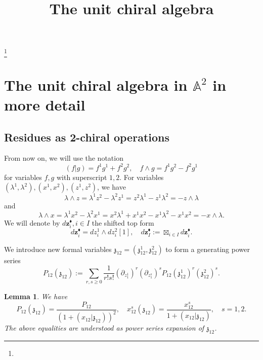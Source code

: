 \documentclass[11pt]{amsart}
\newtheorem{lem}[thm]{Lemma}
\theoremstyle{definition}
\theoremstyle{remark}
\numberwithin{equation}{section}
\begin{document}
\title[]{The unit chiral algebra}%
\author{}%
\address{}%
\email{}%

\thanks{}%
\subjclass{}%
\keywords{}%

\begin{abstract}

\end{abstract}
\maketitle
\tableofcontents


\section{The unit chiral algebra in $\mathbb{A}^2$ in more detail}

\subsection{Residues as 2-chiral operations}

From now on, we will use the notation
$$
(f|g)=f^1g^1+f^2g^2,\quad f\wedge g=f^1g^2-f^2g^1
$$
for variables $f,g$ with superscript $1,2$. For variables $(\lambda^1,\lambda^2), (x^1,x^2), (z^1,z^2)$, we have
$$
\lambda\wedge z=\lambda^1z^2-\lambda^2z^1=z^2\lambda^1-z^1\lambda^2=-z\wedge\lambda
$$
and
$$
\lambda\wedge x=\lambda^1x^2-\lambda^2x^1=x^2\lambda^1+x^1x^2-x^1\lambda^2-x^1x^2=-x\wedge\lambda.
$$
We will denote by $d\mathbf{z}^{\blacklozenge}_i,i\in {I}$ the shifted top form
$$
d\mathbf{z}^{\blacklozenge}_i=dz_i^1\wedge dz^2_i[1],\quad d\mathbf{z}^{\blacklozenge}_I:=\boxtimes_{i\in I}d\mathbf{z}^{\blacklozenge}_i.
$$

We introduce new formal variables $\mathfrak{z}_{12}=(\mathfrak{z}_{12}^1,\mathfrak{z}^2_{12})$ to form a generating power series
$$
P_{12}(\mathfrak{z}_{12}):=\sum_{r,s\geq 0}\frac{1}{r!s!}(\partial_{z^1_1})^r(\partial_{z^s_1})^sP_{12}(\mathfrak{z}^1_{12})^r(\mathfrak{z}^2_{12})^s.
$$

\begin{lem}
  We have
  $$
  P_{12}(\mathfrak{z}_{12})=\frac{P_{12}}{\left(1+(x_{12}|\mathfrak{z}_{12})\right)^2},\quad x^s_{12}(\mathfrak{z}_{12})=\frac{x^s_{12}}{1+(x_{12}|\mathfrak{z}_{12})},\quad s=1,2.
  $$
  The above equalities are understood as power series expansion of $\mathfrak{z}_{12}$.
\end{lem}
\end{document}
